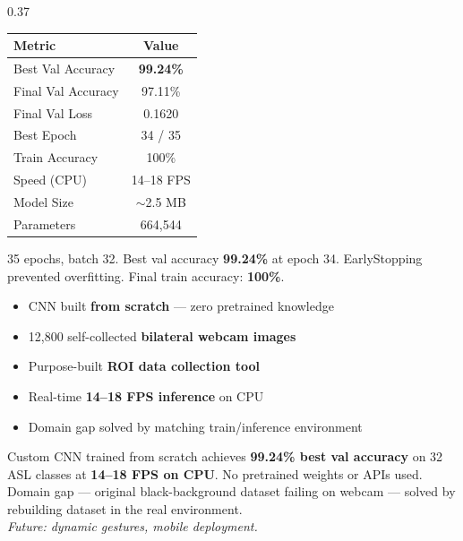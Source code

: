\documentclass[final]{beamer}
\newcommand{\seccard}[2]{%
  \begin{tcolorbox}[postercard, title={#1}]#2\end{tcolorbox}%
}
\newcommand{\highlight}[1]{\textbf{\textcolor{accentred}{#1}}}
\renewcommand{\scriptsize}{\fontsize{8}{9.5}\selectfont}
\renewcommand{\small}{\fontsize{10}{12}\selectfont}
\begin{document}
\begin{frame}[t]{}
\begin{tcolorbox}[
  enhanced,
  colback=white,
  colframe=upesblue,
  boxrule=4pt,
  arc=0pt,
  left=10pt, right=10pt, top=10pt, bottom=10pt,
  width=\textwidth,
]
\begin{columns}[T]
\begin{column}{0.37\textwidth}
\vspace{5pt}

\seccard{Results}{
\scriptsize
\begin{tabular}{@{}lc@{}}
\toprule
\textbf{Metric} & \textbf{Value} \\
\midrule
Best Val Accuracy & \highlight{99.24\%} \\
Final Val Accuracy & 97.11\% \\
Final Val Loss & 0.1620 \\
Best Epoch & 34 / 35 \\
Train Accuracy & 100\% \\
Speed (CPU) & 14--18 FPS \\
Model Size & $\sim$2.5 MB \\
Parameters & 664,544 \\
\bottomrule
\end{tabular}
\hfill
\begin{minipage}{0.52\linewidth}
\raggedright
35 epochs, batch 32. Best val accuracy \highlight{99.24\%} at epoch 34. EarlyStopping prevented overfitting. Final train accuracy: \textbf{100\%}.
\end{minipage}
}

\vspace{5pt}

\seccard{Key Contributions}{
\scriptsize
\begin{itemize}\setlength\itemsep{2pt}
  \item CNN built \textbf{from scratch} --- zero pretrained knowledge
  \item 12,800 self-collected \textbf{bilateral webcam images}
  \item Purpose-built \textbf{ROI data collection tool}
  \item Real-time \textbf{14--18 FPS inference} on CPU
  \item Domain gap solved by matching train/inference environment
\end{itemize}
}

\vspace{5pt}

\seccard{Conclusion}{
\small
Custom CNN trained from scratch achieves \highlight{99.24\% best val accuracy} on 32 ASL classes at \textbf{14--18 FPS on CPU}. No pretrained weights or APIs used. Domain gap --- original black-background dataset failing on webcam --- solved by rebuilding dataset in the real environment.\\[3pt]
\textit{Future: dynamic gestures, mobile deployment.}
}


\end{column}
\end{columns}
\end{tcolorbox}
\end{frame}
\end{document}
